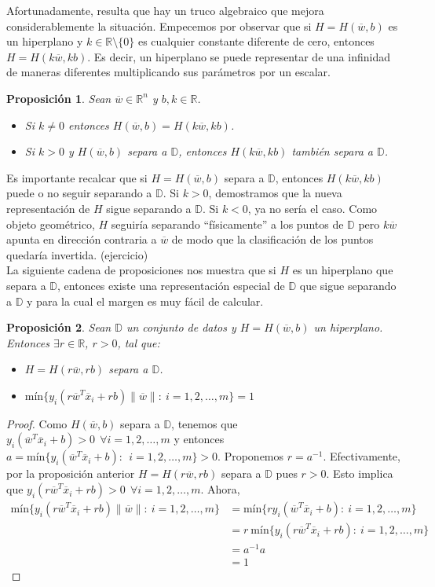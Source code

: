 \documentclass[11pt]{article}
\newtheorem{proposition}{Proposición}[section]
\newcommand{\Rn}{\mathbb{R}^{n}}
\newcommand{\R}{\mathbb{R}}
\newcommand{\wv}{\overline{w}}
\newcommand{\x}{\overline{x}}
\newcommand{\Sm}{1,2,\ldots, m}
\newcommand{\Dat}{\mathbb{D}}
\newcommand{\nw}{\|\wv\|}
\begin{document}
Afortunadamente, resulta que hay un truco algebraico que mejora considerablemente la situación. Empecemos por observar que si $H=H(\wv, b)$ es un hiperplano y $k\in\R\setminus\{0\}$ es cualquier constante diferente de cero, entonces $H=H(k\wv,k b)$. Es decir, un hiperplano se puede representar de una infinidad de maneras diferentes multiplicando sus parámetros por un escalar.

\begin{proposition}
Sean $\wv\in\Rn$ y $b, k\in\R$.
\begin{itemize}
\item[(i)] Si $k\ne0$ entonces $H(\wv, b)=H(k\wv, kb)$.
\item[(ii)] Si $k>0$ y $H(\wv, b)$ separa a $\Dat$, entonces $H(k\wv, kb)$ también separa a $\Dat$.
\end{itemize}
\end{proposition}


Es importante recalcar que si $H=H(\wv, b)$ separa a $\Dat$, entonces $H(k\wv, kb)$ puede o no seguir separando a $\Dat$. Si $k>0$, demostramos que la nueva representación de $H$ sigue separando a $\Dat$. Si $k<0$, ya no sería el caso. Como objeto geométrico, $H$ seguiría separando ``físicamente'' a los puntos de $\Dat$ pero $k\wv$ apunta en dirección contraria a $\wv$ de modo que la clasificación de los puntos quedaría invertida. (ejercicio)\\

La siguiente cadena de proposiciones nos muestra que si $H$ es un hiperplano que separa a $\Dat$, entonces existe una representación especial de $\Dat$ que sigue separando a $\Dat$ y para la cual el margen es muy fácil de calcular.

\begin{proposition}
Sean $\Dat$ un conjunto de datos y $H=H(\wv,b)$ un hiperplano. Entonces $\exists r\in\R$, $r>0$, tal que:
\begin{itemize}
\item[(i)] $H=H(r\wv, rb)$ separa a $\Dat$.
\item[(ii)] $\text{mín}\{y_{i}(r\wv^{T}\x_{i}+rb){\nw}:\ i=\Sm \}=1$
\end{itemize}
\end{proposition}
\begin{proof}
Como $H(\wv, b)$ separa a $\Dat$, tenemos que $y_{i}(\wv ^{T}\x_{i}+b)>0\ \ \forall i=\Sm$ y entonces $a=\text{mín}\{y_{i}(\wv^{T}\x_{i}+b):\ \ i=\Sm \}>0$. Proponemos $r=a^{-1}$. Efectivamente, por la proposición anterior $H=H(r\wv, rb)$ separa a $\Dat$ pues $r>0$. Esto implica que $y_{i}(r\wv^{T}\x_{i}+rb)>0\ \ \forall i=\Sm $. Ahora,
\begin{equation*}
\begin{aligned}
\text{mín}\{y_{i}(r\wv^{T}\x_{i}+rb){\nw}:\ i=\Sm \}&=\text{mín}\{ry_{i}(\wv^{T}\x_{i}+b):\ i=\Sm \}\\
&=r\ \text{mín}\{y_{i}(r\wv^{T}\x_{i}+rb):\ i=\Sm \}\\
&=a^{-1}a\\
&=1
\end{aligned}
\end{equation*}
\end{proof}
\end{document}
